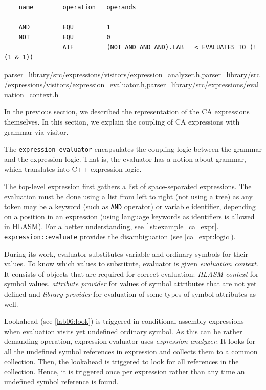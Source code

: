 \begin{listing}[t]
	\begin{verbatim}
    name        operation   operands
	
    AND         EQU         1
    NOT         EQU         0
                AIF         (NOT AND AND AND).LAB   < EVALUATES TO (!(1 & 1))
	\end{verbatim} 
	\caption{An example of using keywords (\texttt{AND} and \texttt{NOT}) as variable names resulting in a confusingly valid expression (line 3).}
	\label{lst:example_ca_expr}
\end{listing}

{parser\_library/src/expressions/visitors/expression\_analyzer.h,parser\_library/src/expressions/visitors/expression\_evaluator.h,parser\_library/src/expressions/evaluation\_context.h}
\label{ca_expr:eval}

In the previous section, we described the representation of the CA expressions themselves. In this section, we explain the coupling of CA expressions with grammar via visitor. 

The \texttt{expression\_evaluator} encapsulates the coupling logic between the grammar and the expression logic. That is, the evaluator has a notion about grammar, which translates into C++ expression logic.

The top-level expression first gathers a list of space-separated expressions. The evaluation must be done using a list from left to right (not using a tree) as any token may be a keyword (such as \texttt{AND} operator) or variable identifier, depending on a position in an expression (using language keywords as identifiers is allowed in HLASM). For a better understanding, see \cref{lst:example_ca_expr}. \texttt{expression::evaluate} provides the disambiguation (see \cref{ca_expr:logic}). 

During its work, evaluator substitutes variable and ordinary symbols for their values. To know which values to substitute, evaluator is given \emph{evaluation context}. It consists of objects that are required for correct evaluation: \emph{HLASM context} for symbol values, \emph{attribute provider} for values of symbol attributes that are not yet defined and \emph{library provider} for evaluation of some types of symbol attributes as well.

Lookahead (see \cref{lab06:look}) is triggered in conditional assembly expressions when evaluation visits yet undefined ordinary symbol. As this can be rather demanding operation, expression evaluator uses \emph{expression analyzer}. It looks for all the undefined symbol references in expression and collects them to a common collection. Then, the lookahead is triggered to look for all references in the collection. Hence, it is triggered once per expression rather than any time an undefined symbol reference is found. 

